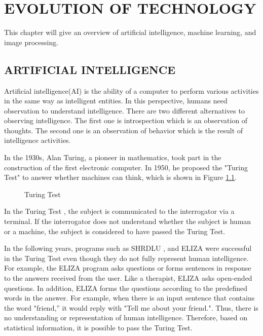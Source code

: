 \chapter{EVOLUTION OF TECHNOLOGY}\label{chp:Evaluation of Technology}

This chapter will give an overview of artificial intelligence, machine learning, and image processing. 

\section{ARTIFICIAL INTELLIGENCE}

Artificial intelligence(AI) is the ability of a computer to perform various activities in the same way as intelligent entities. In this perspective, humans need observation to understand intelligence. There are two different alternatives to observing intelligence. The first one is introspection which is an observation of thoughts. The second one is an observation of behavior which is the result of intelligence activities.

In the 1930s, Alan Turing, a pioneer in mathematics, took part in the construction of the first electronic computer. In 1950, he proposed the "Turing Test" to answer whether machines can think, which is shown in Figure \ref{fig:TuringTest}.

\begin{figure}[htbp]
\centering
{}
\caption{Turing Test \cite{russel2010}}
\label{fig:TuringTest}
\end{figure}

In the Turing Test \cite{turing2009computing}, the subject is communicated to the interrogator via a terminal. If the interrogator does not understand whether the subject is human or a machine, the subject is considered to have passed the Turing Test.

In the following years, programs such as SHRDLU \cite{winograd1972understanding}, and ELIZA \cite{mauldin1994chatterbots} were successful in the Turing Test even though they do not fully represent human intelligence. For example, the ELIZA program asks questions or forms sentences in response to the answers received from the user. Like a therapist, ELIZA asks open-ended questions. In addition, ELIZA forms the questions according to the predefined words in the answer. For example, when there is an input sentence that contains the word "friend,'' it would reply with "Tell me about your friend.". Thus, there is no understanding or representation of human intelligence. Therefore, based on statistical information, it is possible to pass the Turing Test.

